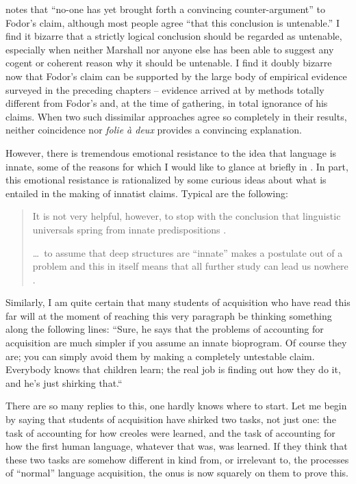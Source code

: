 \citet{Marshall1979} notes that ``no-one has yet brought forth a convincing counter-argument'' to Fodor's claim, although most people agree ``that this conclusion is untenable.'' I find it bizarre that a strictly logical conclusion should be regarded as untenable, especially when neither Marshall nor anyone else has been able to suggest any cogent or coherent reason why it should be untenable. I find it doubly bizarre now that Fodor's claim can be supported by the large body of empirical evidence surveyed in the preceding chapters -- evidence arrived at by methods totally different from Fodor's and, at the time of gathering, in total ignorance of his claims. When two such dissimilar approaches agree so completely in their results, neither coincidence nor \textit{folie \`a deux} provides a convincing explanation.

However, there is tremendous emotional resistance to the idea that language is innate, some of the reasons for which I would like to glance at briefly in . In part, this emotional resistance is rationalized by some curious ideas about what is entailed in the making of innatist claims. Typical are the following:

\begin{quotation}
It is not very helpful, however, to stop with the conclusion that linguistic universals spring from innate predispositions \citep[517]{ClarkEtAl1977}.

\ldots~to assume that deep structures are ``innate'' makes a postulate out of a problem and this in itself means that all further study can lead us nowhere \citep[383]{Luria1975}.

\end{quotation}

Similarly, I am quite certain that many students of acquisition who have read this far will at the moment of reaching this very paragraph be thinking something along the following lines: ``Sure, he says that the problems of accounting for acquisition are much simpler if you assume an innate bioprogram. Of course they are; you can simply avoid them by making a completely untestable claim. Everybody knows that children learn; the real job is finding out how they do it, and he's just shirking that.``


There are so many replies to this, one hardly knows where to start. Let me begin by saying that students of acquisition have shirked two tasks, not just one: the task of accounting for how creoles were learned, and the task of accounting for how the first human language, whatever that was, was learned. If they think that these two tasks are somehow different in kind from, or irrelevant to, the processes of ``normal'' language acquisition, the onus is now squarely on them to prove this.

